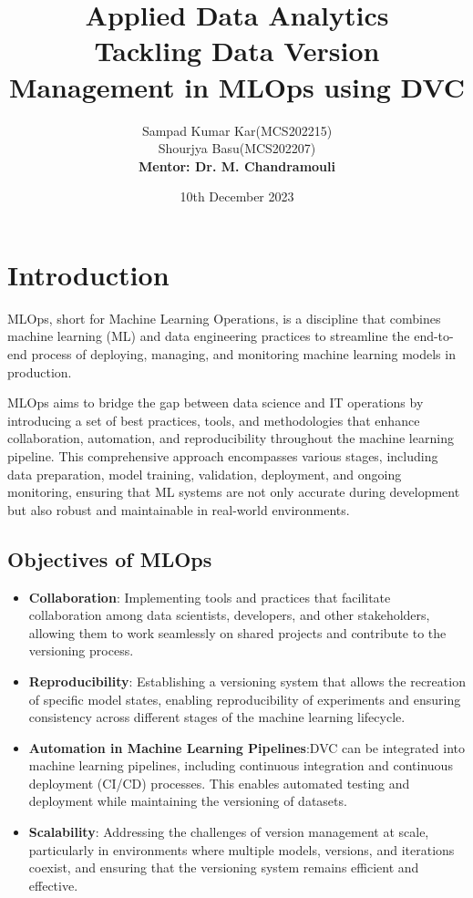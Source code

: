 \documentclass[12pt]{article}
\title{\textbf{Applied Data Analytics} \\
Tackling Data Version Management in MLOps using DVC}
\author{Sampad Kumar Kar(MCS202215) \\
Shourjya Basu(MCS202207) \\
\textbf{Mentor: Dr. M. Chandramouli}}
\date{10th December 2023}
\begin{document}
\maketitle

\tableofcontents

\newpage

\section{Introduction}

MLOps, short for Machine Learning Operations, is a discipline that combines machine learning (ML) and data engineering practices to streamline the end-to-end process of deploying, managing, and monitoring machine learning models in production.

MLOps aims to bridge the gap between data science and IT operations by introducing a set of best practices, tools, and methodologies that enhance collaboration, automation, and reproducibility throughout the machine learning pipeline. This comprehensive approach encompasses various stages, including data preparation, model training, validation, deployment, and ongoing monitoring, ensuring that ML systems are not only accurate during development but also robust and maintainable in real-world environments.

\subsection{Objectives of MLOps}
\begin{itemize}
    \item \textbf{Collaboration}: Implementing tools and practices that facilitate collaboration among data scientists, developers, and other stakeholders, allowing them to work seamlessly on shared projects and contribute to the versioning process.

    \item \textbf{Reproducibility}: Establishing a versioning system that allows the recreation of specific model states, enabling reproducibility of experiments and ensuring consistency across different stages of the machine learning lifecycle.

    \item \textbf{Automation in Machine Learning Pipelines}:DVC can be integrated into machine learning pipelines, including continuous integration and continuous deployment (CI/CD) processes. This enables automated testing and deployment while maintaining the versioning of datasets.
    
    \item \textbf{Scalability}: Addressing the challenges of version management at scale, particularly in environments where multiple models, versions, and iterations coexist, and ensuring that the versioning system remains efficient and effective.
\end{itemize}
\end{document}
